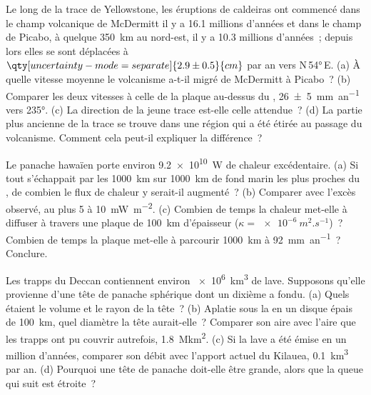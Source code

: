 \begin{exercise}[$\star\star$]\label{exo:b1:hotspots:8}
Le long de la trace de Yellowstone, les éruptions de caldeiras ont commencé dans le champ
volcanique de McDermitt il y a 16.1 millions d'années et dans le champ de Picabo, à quelque
\qty{350}{km} au nord-est, il y a 10.3 millions d'années~; depuis lors elles se sont
déplacées à $\qty[uncertainty-mode=separate]{2.9 \pm 0.5}{cm}$ par an vers
N\,\ang{54}\,E. (a) À quelle vitesse moyenne le volcanisme a-t-il migré de McDermitt
à Picabo~? (b) Comparer les deux vitesses à celle de la plaque au-dessus du ,
\qty[uncertainty-mode=separate]{26 \pm 5}{mm.an^{-1}} vers \ang{235}. (c) La
direction de la jeune trace est-elle celle attendue~? (d) La partie plus ancienne de la
trace se trouve dans une région qui a été étirée au passage du volcanisme. Comment
cela peut-il expliquer la différence~?
\end{exercise}

\begin{exercise}[$\star\star$]\label{exo:b1:hotspots:9}
Le panache hawaïen porte environ \qty{9.2e10}{W} de chaleur excédentaire. (a) Si tout
s'échappait par les \qty{1000}{km} sur \qty{1000}{km} de fond marin les plus proches du
, de combien le flux de chaleur y serait-il augmenté~? (b) Comparer avec
l'excès observé, au plus 5 à \qty{10}{mW.m^{-2}}. (c) Combien de temps la chaleur met-elle à
diffuser à travers une plaque de \qty{100}{km} d'épaisseur ($\kappa = \qty{e-6}{m^2.s^{-1}}$)~?
Combien de temps la plaque met-elle à parcourir \qty{1000}{km} à \qty{92}{mm.an^{-1}}~?
Conclure.
\end{exercise}

\begin{exercise}[$\star\star\star$]\label{exo:b1:hotspots:10}
Les trapps du Deccan contiennent environ \qty{e6}{km^3} de lave. Supposons qu'elle provienne
d'une tête de panache sphérique dont un dixième a fondu. (a) Quels étaient le volume et
le rayon de la tête~? (b) Aplatie sous la  en un disque épais de
\qty{100}{km}, quel diamètre la tête aurait-elle~? Comparer son aire avec
l'aire que les trapps ont pu couvrir autrefois, \qty{1.8}{\mega km^2}. (c) Si la
lave a été émise en un million d'années, comparer son débit avec l'apport actuel
du Kilauea, \qty{0.1}{km^3} par an. (d) Pourquoi une tête de panache doit-elle être grande,
alors que la queue qui suit est étroite~?
\end{exercise}

